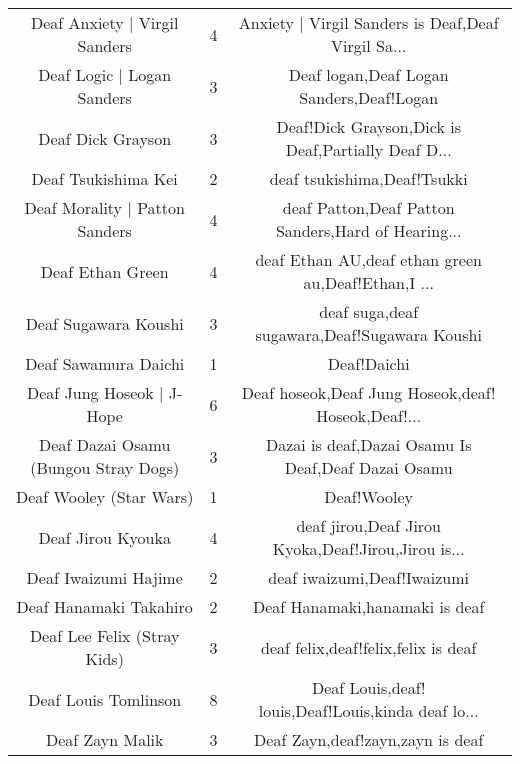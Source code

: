 \begin{table}[h!]
{\begin{tabular}{|c|c|c|}
                     Deaf Anxiety | Virgil Sanders &      4 & Anxiety | Virgil Sanders is Deaf,Deaf Virgil Sa... \\
                        Deaf Logic | Logan Sanders &      3 &           Deaf logan,Deaf Logan Sanders,Deaf!Logan \\
                                 Deaf Dick Grayson &      3 & Deaf!Dick Grayson,Dick is Deaf,Partially Deaf D... \\
                               Deaf Tsukishima Kei &      2 &                        deaf tsukishima,Deaf!Tsukki \\
                    Deaf Morality | Patton Sanders &      4 & deaf Patton,Deaf Patton Sanders,Hard of Hearing... \\
                                  Deaf Ethan Green &      4 & deaf Ethan AU,deaf ethan green au,Deaf!Ethan,I ... \\
                              Deaf Sugawara Koushi &      3 &       deaf suga,deaf sugawara,Deaf!Sugawara Koushi \\
                              Deaf Sawamura Daichi &      1 &                                        Deaf!Daichi \\
                         Deaf Jung Hoseok | J-Hope &      6 & Deaf hoseok,Deaf Jung Hoseok,deaf! Hoseok,Deaf!... \\
              Deaf Dazai Osamu (Bungou Stray Dogs) &      3 & Dazai is deaf,Dazai Osamu Is Deaf,Deaf Dazai Osamu \\
                           Deaf Wooley (Star Wars) &      1 &                                        Deaf!Wooley \\
                                 Deaf Jirou Kyouka &      4 & deaf jirou,Deaf Jirou Kyoka,Deaf!Jirou,Jirou is... \\
                              Deaf Iwaizumi Hajime &      2 &                        deaf iwaizumi,Deaf!Iwaizumi \\
                            Deaf Hanamaki Takahiro &      2 &                     Deaf Hanamaki,hanamaki is deaf \\
                       Deaf Lee Felix (Stray Kids) &      3 &                deaf felix,deaf!felix,felix is deaf \\
                              Deaf Louis Tomlinson &      8 & Deaf Louis,deaf! louis,Deaf!Louis,kinda deaf lo... \\
                                   Deaf Zayn Malik &      3 &                   Deaf Zayn,deaf!zayn,zayn is deaf \\

\end{tabular}}
\end{table}
